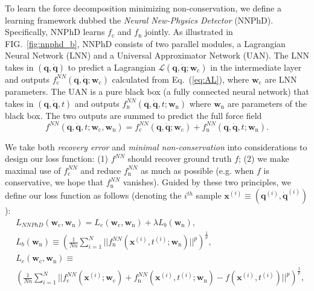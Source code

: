 \documentclass[aps,pre,reprint,superscriptaddress,nofootinbib,amsmath,amssymb]{revtex4-2}
\newcommand{\mat}[1]{\mathbf{#1}}
\newcommand{\x}{\mat{x}}
\newcommand{\q}{\mat{q}}
\newcommand{\qd}{\dot{\mat{q}}}
\newcommand{\lag}{\mathcal{L}}
\newcommand{\w}{\boldsymbol{w}}
\begin{document}
To learn the force decomposition minimizing non-conservation, we define a learning framework dubbed the \textit{Neural New-Physics Detector} (NNPhD).
Specifically, NNPhD learns $f_{\mathrm{c}}$ and $f_{\mathrm{n}}$ jointly. 
As illustrated in FIG.~\ref{fig:nnphd_b}, NNPhD consists of two parallel modules, a Lagrangian Neural Network (LNN) and a Universal Approximator Network (UAN). The LNN takes in $(\q,\qd)$ to predict a Lagrangian $\lag(\q,\qd;\w_{\mathrm{c}})$ in the intermediate layer and outputs $f_{\mathrm{c}}^{NN}(\q,\qd;\w_{\mathrm{c}})$ calculated from Eq.~(\ref{eq:AL}), where $\w_{\mathrm{c}}$ are LNN parameters. The UAN is a pure black box (a fully connected neural network) that takes in $(\q,\qd,t)$ and outputs $f_{\mathrm{n}}^{NN}(\q,\qd,t;\w_{\mathrm{n}})$ where $\w_{\mathrm{n}}$ are parameters of the black box. The two outputs are summed to predict the full force field
\begin{equation}
    f^{NN}(\q,\qd,t;\w_{\mathrm{c}},\w_{\mathrm{n}})=f_{\mathrm{c}}^{NN}(\q,\qd;\w_{\mathrm{c}})+f_{\mathrm{n}}^{NN}(\q,\qd,t;\w_{\mathrm{n}}).
\end{equation}


{We take both \textit{recovery error} and \textit{minimal non-conservation} into considerations to design our loss function:} (1) $f^{NN}$ should recover ground truth $f$; (2) we make maximal use of $f_{\mathrm{c}}^{NN}$ and reduce $f_{\mathrm{n}}^{NN}$ as much as possible (e.g. when $f$ is conservative, we hope that  $f_{\mathrm{n}}^{NN}$ vanishes). Guided by these two principles, we define our loss function as follows (denoting the $i^{th}$ sample $\x^{(i)}\equiv (\q^{(i)},\qd^{(i)})$):
{\small\begin{equation}\label{eq:loss}	    
\begin{aligned}
	&L_{NNPhD}(\w_{\mathrm{c}},\w_{\mathrm{n}})= L_e(\w_{\mathrm{c}},\w_{\mathrm{n}}) + \lambda L_b(\w_{\mathrm{n}}),\\
    &L_b(\w_{\mathrm{n}}) \equiv \left(\frac{1}{Nn}\sum_{i=1}^N ||f_{\mathrm{n}}^{NN}(\x^{(i)},t^{(i)};\w_{\mathrm{n}})||^p\right)^{\frac{1}{p}},\\
        &L_e(\w_{\mathrm{c}},\w_{\mathrm{n}}) \equiv \\ &\left(\frac{1}{Nn}\sum_{i=1}^N ||f_{\mathrm{c}}^{NN}(\x^{(i)};\w_{\mathrm{c}})+f_{\mathrm{n}}^{NN}(\x^{(i)},t^{(i)};\w_{\mathrm{n}})-f(\x^{(i)},t^{(i)})||^p\right)^{\frac{1}{p}},
\end{aligned}
\end{equation}}
\end{document}
